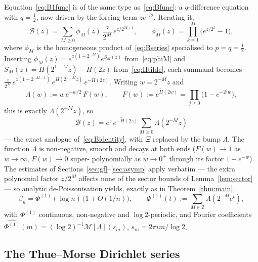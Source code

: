 \documentclass[11pt]{article}
\theoremstyle{definition}
\newcommand{\Z}{\mathbb{Z}}
\newcommand{\Mellin}{\mathcal{M}}
\begin{document}
Equation~\eqref{eq:B1func} is of the same type as~\eqref{eq:Bfunc}: a
$q$-difference equation with $q=\tfrac12$, now driven by the forcing
term $ze^{z/2}$. Iterating it,
\begin{equation}\label{eq:B1series}
  \mathcal B(z)=\sum_{M\ge0}\phi_M(z)\,\frac{z}{2^M}\,e^{z/2^{M+1}},
  \qquad
  \phi_M(z)=\prod_{k=1}^{M}\bigl(e^{z/2^{k}}-1\bigr),
\end{equation}
where $\phi_M$ is the homogeneous product of~\eqref{eq:Bseries}
specialised to $p=q=\tfrac12$. Inserting $\phi_M(z)=
e^{z(1-2^{-M})}e^{S_M(z)}$ from~\eqref{eq:phiM} and
$S_M(z)=\tilde H(2^{1-M}z)-\tilde H(2z)$ from~\eqref{eq:Htilde}, each
summand becomes $\tfrac z{2^M}\,e^{z(1-2^{-M-1})}\,
e^{\tilde H(2^{1-M}z)}\,e^{-\tilde H(2z)}$. Writing $w=2^{-M}z$ and
\begin{equation}\label{eq:Lambda}
  \Lambda(w):=w\,e^{-w/2}\,F(w),\qquad
  F(w):=e^{\tilde H(2w)}=\prod_{j\ge0}\bigl(1-e^{-2^{j}w}\bigr),
\end{equation}
this is exactly $\Lambda(2^{-M}z)$, so
\begin{equation}\label{eq:B1identity}
  \mathcal B(z)=e^{z}\,e^{-\tilde H(2z)}\sum_{M\ge0}\Lambda(2^{-M}z)
\end{equation}
--- the exact analogue of~\eqref{eq:Bidentity}, with $\Xi$ replaced by
the bump $\Lambda$. The function $\Lambda$ is non-negative, smooth and
decays at both ends ($F(w)\to1$ as $w\to\infty$, $F(w)\to0$ super-%
polynomially as $w\to0^+$ through its factor $1-e^{-w}$). The estimates
of Sections~\ref{sec:gf}--\ref{sec:asymp} apply verbatim --- the extra
polynomial factor $z/2^M$ affects none of the sector bounds of
Lemma~\ref{lem:sector} --- so analytic de-Poissonisation yields,
exactly as in Theorem~\ref{thm:main},
\begin{equation}\label{eq:b1asymp}
  \beta_n=\Phi^{(1)}(\log n)\,\bigl(1+O(1/n)\bigr),\qquad
  \Phi^{(1)}(t):=\sum_{M\in\Z}\Lambda(2^{-M}e^{t}),
\end{equation}
with $\Phi^{(1)}$ continuous, non-negative and $\log2$-periodic, and
Fourier coefficients $\widehat{\Phi^{(1)}}(m)=(\log2)^{-1}
\Mellin[\Lambda](s_m)$, $s_m=2\pi i m/\log2$.

\subsection{The Thue--Morse Dirichlet series}
\end{document}
